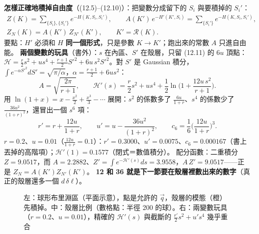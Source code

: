 \textbf{怎樣正確地積掉自由度}（(12.5)--(12.10)）：把變數分成留下的 $S_i$ 與要積掉的 $S_i'$：
\[\begin{gathered}Z(K)=\sum_{\{S_i\},\{S_i'\}}e^{-H(K,S_i,S_i')},\qquad A(K')\,e^{-H'(K',S_i)}=\sum_{\{S_i'\}}e^{-H(K,S_i,S_i')},\\
Z_N(K)=A(K')\,Z_{N'}(K'),\qquad K'=\mathcal R(K).\end{gathered}\tag{12.5--12.10}\]
要點：$H'$ 必須和 $H$ \textbf{同一個形式}，只是參數 $K\to K'$；跑出來的常數 $A$ 只進自由能。
\textbf{兩個變數的玩具}（書外）：$s$ 在內區、$S'$ 在殼層，只留 (12.11) 的 $6u$ 頂點：
$\mathcal H=\frac r2s^2+us^4+\frac{r+1}2S'^2+6u\,s^2S'^2$。對 $S'$ 是 Gaussian 積分，$\int e^{-\alpha S'^2}dS'=\sqrt{\pi/\alpha}$，$\alpha=\frac{r+1}2+6us^2$：
\[A=\sqrt{\frac{2\pi}{r+1}},\qquad \mathcal H'(s)=\frac r2s^2+us^4+\frac12\ln\Big(1+\frac{12u\,s^2}{r+1}\Big).\]
用 $\ln(1+x)=x-\frac{x^2}2+\frac{x^3}3-\cdots$ 展開：$s^2$ 的係數多了 $\frac{6u}{1+r}$、$s^4$ 的係數少了 $\frac{36u^2}{(1+r)^2}$，還冒出一個 $s^6$ 項：
\[r'=r+\frac{12u}{1+r},\qquad u'=u-\frac{36u^2}{(1+r)^2},\qquad c_6=\frac16\Big(\frac{12u}{1+r}\Big)^3.\]
$r=0.2$、$u=0.01$（$\frac{12u}{1+r}=0.1$）：$r'=0.3000$、$u'=0.0075$、$c_6=0.000167$（書上丟掉的高階項）；$\mathcal H'(1)=0.1577$（閉式＝數值積分）。
配分函數：二重積分 $Z=9.0517$，而 $A=2.2882$、$Z'=\int e^{-\mathcal H'(s)}ds=3.9558$，$A\,Z'=9.0517$——正是 $Z_N=A(K')Z_{N'}(K')$。
\textbf{12 和 36 就是下一節要在殼層裡數出來的數字}（真正的殼層還多一個 $d\,\delta\ell$）。

\begin{figure}[htbp]
\centering
\begin{minipage}[c]{0.28\linewidth}\centering\TwelveFigShell\end{minipage}\hfill
\begin{minipage}[c]{0.31\linewidth}\centering\footnotesize\setlength{\tabcolsep}{3pt}\TwelveTabShell\end{minipage}\hfill
\begin{minipage}[c]{0.38\linewidth}\centering\TwelveFigToy\end{minipage}
\caption{左：球形布里淵區（平面示意），點是允許的 $\vec q$，殼層的模態（橙）先積掉。中：殼層比例（數格點：半徑 200 的球）。右：兩變數玩具（$r=0.2$、$u=0.01$），精確的 $\mathcal H'(s)$ 與截斷的 $\frac{r'}2s^2+u's^4$ 幾乎重合}\label{twelve-fig-shell}
\end{figure}

